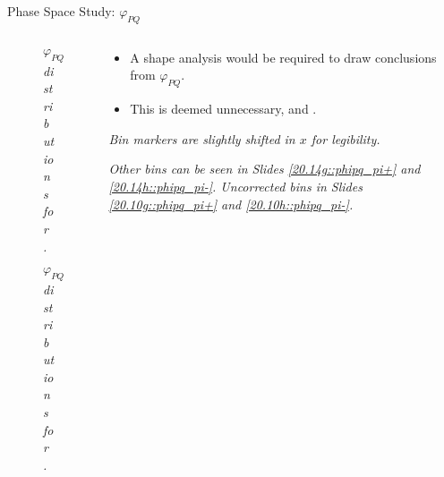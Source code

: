 \begin{frame}{Phase Space Study: $\varphi_{PQ}$}
    \label{12.16::phipq}

    \begin{columns}[onlytextwidth,T]

    \begin{column}{.44\linewidth}
        \vspace{-15pt}
        \begin{center}
            \begin{figure}[t]
                \scriptsize{\textit{$\varphi_{PQ}$ distributions for \ef{$\pi^-$}.}}
            \end{figure}

            \vspace{-9pt}
            \begin{figure}[t]
                \scriptsize{\textit{$\varphi_{PQ}$ distributions for \ef{$\pi^+$}.}}
            \end{figure}
        \end{center}
    \end{column}

    \begin{column}{.54\linewidth}
        \begin{itemize}
            \item
                A shape analysis would be required to draw conclusions from $\varphi_{PQ}$.

            \vspace{12pt}
            \item
                This is deemed unnecessary, and .
        \end{itemize}

        \vspace{119pt}

        \begin{flushright}
            \tiny{\textit{Bin markers are slightly shifted in $x$ for legibility.}}

            \tiny{\textit{
                Other bins can be seen in Slides \textcolor{efd_purple}{\ref{20.14g::phipq_pi+}} and \textcolor{efd_purple}{\ref{20.14h::phipq_pi-}}.
                Uncorrected bins in Slides \textcolor{efd_purple}{\ref{20.10g::phipq_pi+}} and \textcolor{efd_purple}{\ref{20.10h::phipq_pi-}}.
            }}
        \end{flushright}
    \end{column}

    \end{columns}
\end{frame}
